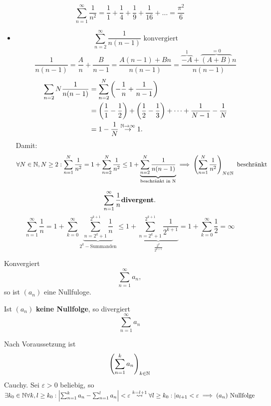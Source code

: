 \begin{subexample}
	\[ \sum_{n=1}^{\infty} \frac{1}{n^2} = \frac{1}{1} + \frac{1}{4} + \frac{1}{9} + \frac{1}{16} + \dotsc = \frac{\pi^2}{6} \]
	\begin{itemize}
		\item \[ \sum_{n=2}^{\infty} \frac{1}{n(n-1)} \text{ konvergiert}\]
			\[ \frac{1}{n(n-1)} = \frac{A}{n} + \frac{B}{n-1} = \frac{A(n-1) + Bn}{n(n-1)} = \frac{\overbrace{-A}^{1} + \overbrace{(A+B)}^{=0}n}{n(n-1)} \]
			\begin{align*}
				\sum_{n=2}{N} \frac{1}{n(n-1)} &= \sum_{n=2}^{N} \left( - \frac{1}{n} + \frac{1}{n-1} \right)\\
				~&= \left( \frac{1}{1} - \frac{1}{2} \right) + \left( \frac{1}{2} - \frac{1}{3} \right) + \dotsb + \frac{1}{N-1} - \frac{1}{N}\\
				~&= 1 - \frac{1}{N} \overset{\mathbb{N}\to\infty}{\to} 1.
			\end{align*}
			Damit:
			\[ \forall N \in \mathbb{N}, N \geq 2: \sum_{n=1}^{N} \frac{1}{n^2} = 1 + \sum_{n=2}^{N} \frac{1}{n^2} \leq 1 + \underbrace{\sum_{n=2}^{N} \frac{1}{n(n-1)}}_{\text{beschränkt in N}} \implies \left(\sum_{n=1}^{N} \frac{1}{n^2} \right)_{N\in\mathbb{N}} \text{ beschränkt} \]
	\end{itemize}
\end{subexample}
\begin{subexample}
	\[ \sum_{n=1}^{\infty} \frac{1}{n} \text{\textbf{divergent}}.\]
	\[ \sum_{n=1}^{\infty} \frac{1}{n} = 1 + \sum_{k=0}^{\infty} \underbrace{\sum_{n=2^{k} + 1}^{2^{k+1}} \frac{1}{n}}_{2^k-\text{Summanden}} \leq 1 + \underbrace{\sum_{n=2^{k} + 1}^{2^{k+1}} \frac{1}{2^{k+1}}}_{\frac{2^k}{2^{k+1}}} = 1 + \sum_{k=0}^{\infty}\frac{1}{2} = \infty \]
\end{subexample}

\begin{sublemma}
	Konvergiert
	\[ \sum_{n=1}^{\infty} a_n, \]
	so ist $ (a_n) $ eine Nullfuloge.
\end{sublemma}
\begin{subcorollary}[Trivialkriterium]
	Ist $(a_n)$ \textbf{keine Nullfolge}, so divergiert
	\[ \sum_{n=1}^{\infty} a_n \]
\end{subcorollary}

\begin{subproof*}
	Nach Voraussetzung ist
	\[ \left( \sum_{n=1}^{k} a_n \right)_{k\in\mathbb{N}} \]
	Cauchy.
	Sei $ \varepsilon > 0 $ beliebig, so $ \exists k_0 \in \mathbb{N} \forall k, l \geq k_0 : \left| \sum_{n=1}^{k} a_n - \sum_{n=1}^{l}a_n \right| < \varepsilon \overset{k = l+1}{\rightsquigarrow} \forall l \geq k_0 : | a_{l+1} < \varepsilon \implies (a_n) \text{ Nullfolge} $
\end{subproof*}

